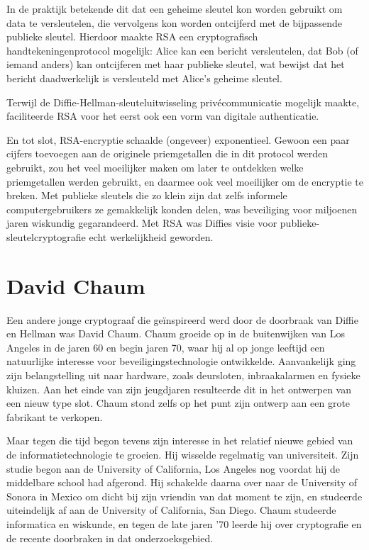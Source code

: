 \documentclass[
  a5paper,
  smalldemyvopaper,11pt,twoside,onecolumn,openright,extrafontsizes,
hidelinks]{memoir}
\begin{document}
In de praktijk betekende dit dat een geheime sleutel kon worden gebruikt
om data te versleutelen, die vervolgens kon worden ontcijferd met de
bijpassende publieke sleutel. Hierdoor maakte RSA een cryptografisch
handtekeningenprotocol mogelijk: Alice kan een bericht versleutelen, dat
Bob (of iemand anders) kan ontcijferen met haar publieke sleutel, wat
bewijst dat het bericht daadwerkelijk is versleuteld met Alice's geheime
sleutel.

Terwijl de Diffie-Hellman-sleuteluitwisseling privécommunicatie mogelijk
maakte, faciliteerde RSA voor het eerst ook een vorm van digitale
authenticatie.

En tot slot, RSA-encryptie schaalde (ongeveer) exponentieel. Gewoon een
paar cijfers toevoegen aan de originele priemgetallen die in dit
protocol werden gebruikt, zou het veel moeilijker maken om later te
ontdekken welke priemgetallen werden gebruikt, en daarmee ook veel
moeilijker om de encryptie te breken. Met publieke sleutels die zo klein
zijn dat zelfs informele computergebruikers ze gemakkelijk konden delen,
was beveiliging voor miljoenen jaren wiskundig gegarandeerd. Met RSA was Diffies visie voor publieke-sleutelcryptografie echt
werkelijkheid geworden.

\section{David Chaum}\label{david-chaum}

Een andere jonge cryptograaf die geïnspireerd werd door de doorbraak van
Diffie en Hellman was David Chaum. Chaum groeide op in de buitenwijken van Los Angeles in de jaren 60 en
begin jaren 70, waar hij al op jonge leeftijd een natuurlijke interesse
voor beveiligingstechnologie ontwikkelde. Aanvankelijk ging zijn
belangstelling uit naar hardware, zoals deursloten, inbraakalarmen en
fysieke kluizen. Aan het einde van zijn jeugdjaren resulteerde dit in
het ontwerpen van een nieuw type slot. Chaum stond zelfs op het punt
zijn ontwerp aan een grote fabrikant te verkopen.

Maar tegen die tijd begon tevens zijn interesse in het relatief nieuwe
gebied van de informatietechnologie te groeien. Hij wisselde regelmatig
van universiteit. Zijn studie begon aan de University of California, Los
Angeles nog voordat hij de middelbare school had afgerond. Hij schakelde
daarna over naar de University of Sonora in Mexico om dicht bij zijn
vriendin van dat moment te zijn, en studeerde uiteindelijk af aan de
University of California, San Diego. Chaum studeerde informatica en
wiskunde, en tegen de late jaren '70 leerde hij over cryptografie en de
recente doorbraken in dat onderzoeksgebied.
\end{document}
